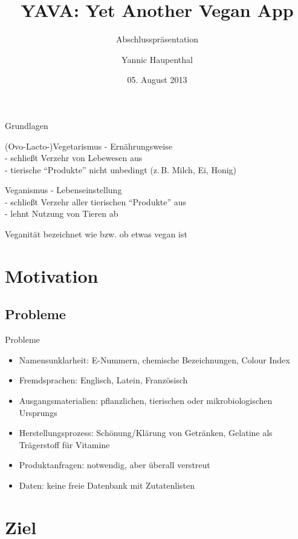 \documentclass{beamer}
\title[YAVA]{YAVA: Yet Another Vegan App}
\subtitle{Abschlusspräsentation}
\author[Y. Haupenthal]{Yannic Haupenthal}
\institute[UdS]{Universität des Saarlandes}
\date[05.08.2013]{05. August 2013}
\begin{document}
\frame{
	\titlepage
}

\begin{frame}{Grundlagen}
		\begin{block}{(Ovo-Lacto-)Vegetarismus}
		- Ernährungsweise\\
		- schließt Verzehr von Lebewesen aus\\
		- tierische ``Produkte'' nicht unbedingt (z.\,B. Milch, Ei,
		Honig)
	\end{block}

	\begin{block}{Veganismus}
		- Lebenseinstellung\\
		- schließt Verzehr aller tierischen ``Produkte'' aus\\
		- lehnt Nutzung von Tieren ab
	\end{block}

	\begin{block}{Veganität}
		bezeichnet wie bzw. ob etwas vegan ist
	\end{block}
\end{frame}


\section{Motivation}
\subsection*{Probleme}
\begin{frame}{Probleme}
	\begin{itemize}
		\item Namensunklarheit: E-Nummern, chemische
				Bezeichnungen, Colour Index
		\item Fremdsprachen: Englisch, Latein, Französisch
		\item Ausgangsmaterialien: pflanzlichen, tierischen oder
				mikrobiologischen Ursprungs
		\item Herstellungsprozess: Schönung/Klärung von Getränken,
				Gelatine als Trägerstoff für Vitamine
		\item Produktanfragen: notwendig, aber überall verstreut
		\item Daten: keine freie Datenbank mit Zutatenlisten
	\end{itemize}
\end{frame}

\section{Ziel}
\end{document}
